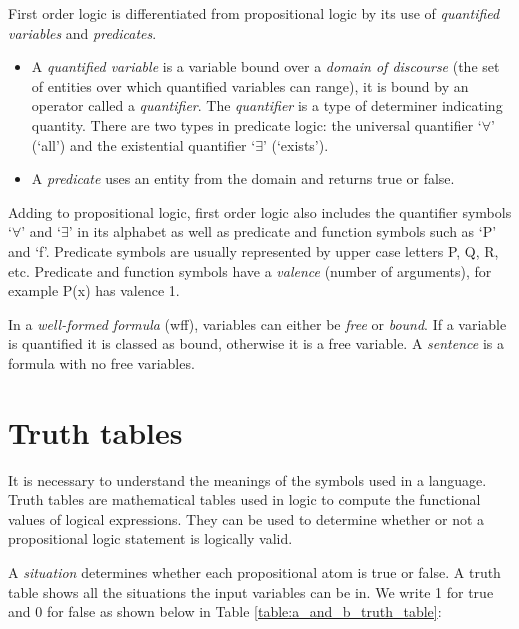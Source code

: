 \documentclass[draft]{report}
\begin{document}
First order logic is differentiated from propositional logic by its use of \textit{quantified variables} and \textit{predicates}. 

\begin{itemize}
\item A \textit{quantified variable} is a variable bound over a \textit{domain of discourse} (the set of entities over which quantified variables can range), it is bound by an operator called a \textit{quantifier}. The \textit{quantifier} is a type of determiner indicating quantity. There are two types in predicate logic: the universal quantifier `$\forall$' (`all') and the existential quantifier `$\exists$' (`exists').
\item A \textit{predicate} uses an entity from the domain and returns true or false. 
\end{itemize}

Adding to propositional logic, first order logic also includes the quantifier symbols `$\forall$' and `$\exists$' in its alphabet as well as predicate and function symbols such as `P' and `f'. Predicate symbols are usually represented by upper case letters P, Q, R, etc. Predicate and function symbols have a \textit{valence} (number of arguments), for example P(x) has valence 1.

In a \emph{well-formed formula} (wff), variables can either be \emph{free} or \emph{bound}. If a variable is quantified it is classed as bound, otherwise it is a free variable. A \emph{sentence} is a formula with no free variables.

\section{Truth tables}
\label{sec:truth_tables}

It is necessary to understand the meanings of the symbols used in a language. Truth tables are mathematical tables used in logic to compute the functional values of logical expressions. They can be used to determine whether or not a propositional logic statement is logically valid.

A \textit{situation} determines whether each propositional atom is true or false. A truth table shows all the situations the input variables can be in. We write 1 for true and 0 for false as shown below in Table \ref{table:a_and_b_truth_table}:
\end{document}
